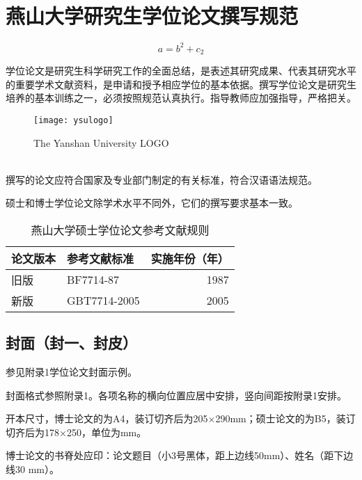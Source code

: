 \chapter{燕山大学研究生学位论文撰写规范}
\label{appendix}
\renewcommand\theequation{A-\arabic{equation}}
\renewcommand\thefigure{A-\arabic{figure}}
\renewcommand\thetable{A-\arabic{table}}


\begin{equation}\label{A1}
a=b^2+c_2
\end{equation}

学位论文是研究生科学研究工作的全面总结，是表述其研究成果、代表其研究水平的重要学术文献资料，是申请和授予相应学位的基本依据。撰写学位论文是研究生培养的基本训练之一，必须按照规范认真执行。指导教师应加强指导，严格把关。
\begin{figure}[htbp]
\centering
\texttt{[image: ysulogo]}
\caption{The Yanshan University LOGO}
\end{figure}\\
撰写的论文应符合国家及专业部门制定的有关标准，符合汉语语法规范。

硕士和博士学位论文除学术水平不同外，它们的撰写要求基本一致。

\begin{table}[htbp]
 \centering{}
 \caption{燕山大学硕士学位论文参考文献规则}\label{tab:ysubof1}
 \begin{tabular}{llr}
 \toprule
    论文版本    & 参考文献标准    & 实施年份（年）  \\
 \midrule
    旧版        & BF7714-87       & 1987            \\
    新版        & GBT7714-2005    & 2005            \\
 \bottomrule
 \end{tabular}
\end{table}

\section{封面（封一、封皮）}\label{appendixA-1}

参见附录1学位论文封面示例。

封面格式参照附录1。各项名称的横向位置应居中安排，竖向间距按附录1安排。

开本尺寸，博士论文的为A4，装订切齐后为205×290mm；硕士论文的为B5，装订切齐后为178×250，单位为mm。

博士论文的书脊处应印：论文题目（小3号黑体，距上边线50mm）、姓名（距下边线30 mm）。

